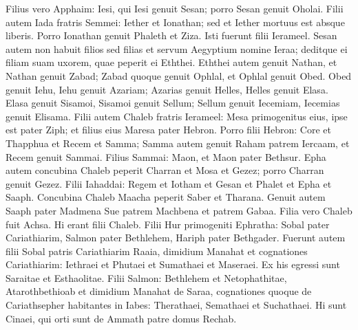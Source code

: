\begin{biblechapter}
\begin{biblechapter}
\verse Filius vero Apphaim: Iesi, qui Iesi genuit Sesan; porro Sesan genuit Oholai. 
\verse Filii autem Iada fratris Semmei: Iether et Ionathan; sed et Iether mortuus est absque liberis. 
 \verse Porro Ionathan genuit Phaleth et Ziza. Isti fuerunt filii Ierameel. 
\verse Sesan autem non habuit filios sed filias et servum Aegyptium nomine Ieraa; 
 \verse deditque ei filiam suam uxorem, quae peperit ei Eththei. 
\verse Eththei autem genuit Nathan, et Nathan genuit Zabad; 
\verse Zabad quoque genuit Ophlal, et Ophlal genuit Obed. 
\verse Obed genuit Iehu, Iehu genuit Azariam; 
\verse Azarias genuit Helles, Helles genuit Elasa. 
 \verse Elasa genuit Sisamoi, Sisamoi genuit Sellum; 
\verse Sellum genuit Iecemiam, Iecemias genuit Elisama.
 \verse Filii autem Chaleb fratris Ierameel: Mesa primogenitus eius, ipse est pater Ziph; et filius eius Maresa pater Hebron. 
\verse Porro filii Hebron: Core et Thapphua et Recem et Samma; 
\verse Samma autem genuit Raham patrem Iercaam, et Recem genuit Sammai. 
\verse Filius Sammai: Maon, et Maon pater Bethsur.
 \verse Epha autem concubina Chaleb peperit Charran et Mosa et Gezez; porro Charran genuit Gezez. 
\verse Filii Iahaddai: Regem et Iotham et Gesan et Phalet et Epha et Saaph.
 \verse Concubina Chaleb Maacha peperit Saber et Tharana. 
\verse Genuit autem Saaph pater Madmena Sue patrem Machbena et patrem Gabaa. Filia vero Chaleb fuit Achsa. 
 \verse Hi erant filii Chaleb.
 Filii Hur primogeniti Ephratha: Sobal pater Cariathiarim, 
\verse Salmon pater Bethlehem, Hariph pater Bethgader. 
\verse Fuerunt autem filii Sobal patris Cariathiarim Raaia, dimidium Manahat 
\verse et cognationes Cariathiarim: Iethraei et Phutaei et Sumathaei et Maseraei. Ex his egressi sunt Saraitae et Esthaolitae. 
\verse Filii Salmon: Bethlehem et Netophathitae, Atarothbethioab et dimidium Manahat de Saraa, 
\verse cognationes quoque de Cariathsepher habitantes in Iabes: Therathaei, Semathaei et Suchathaei. Hi sunt Cinaei, qui orti sunt de Ammath patre domus Rechab.
 

\end{biblechapter}
\end{biblechapter}
